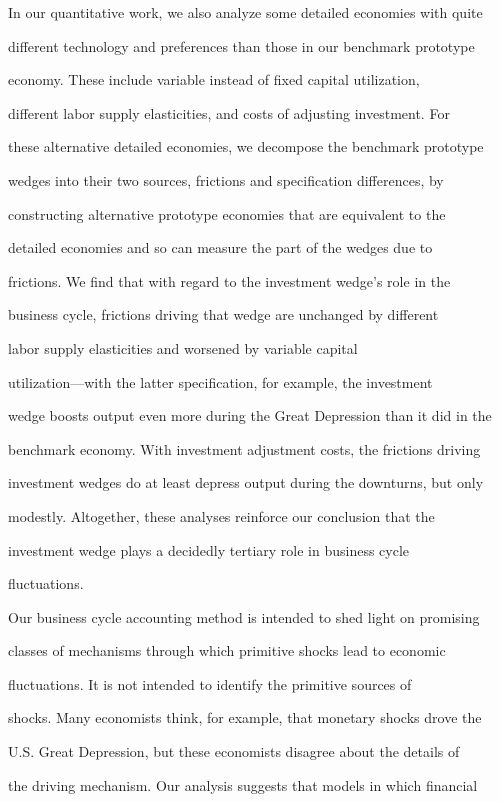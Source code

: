 \documentclass[fleqn,leqno,11pt]{article}
\begin{document}
In our quantitative work, we also analyze some detailed economies with quite

different technology and preferences than those in our benchmark prototype

economy. These include variable instead of fixed capital utilization,

different labor supply elasticities, and costs of adjusting investment. For

these alternative detailed economies, we decompose the benchmark prototype

wedges into their two sources, frictions and specification differences, by

constructing alternative prototype economies that are equivalent to the

detailed economies and so can measure the part of the wedges due to

frictions. We find that with regard to the investment wedge's role in the

business cycle, frictions driving that wedge are unchanged by different

labor supply elasticities and worsened by variable capital

utilization---with the latter specification, for example, the investment

wedge boosts output even more during the Great Depression than it did in the

benchmark economy. With investment adjustment costs, the frictions driving

investment wedges do at least depress output during the downturns, but only

modestly. Altogether, these analyses reinforce our conclusion that the

investment wedge plays a decidedly tertiary role in business cycle

fluctuations.



Our business cycle accounting method is intended to shed light on promising

classes of mechanisms through which primitive shocks lead to economic

fluctuations. It is not intended to identify the primitive sources of

shocks. Many economists think, for example, that monetary shocks drove the

U.S. Great Depression, but these economists disagree about the details of

the driving mechanism. Our analysis suggests that models in which financial
\end{document}
